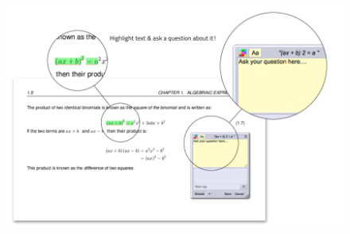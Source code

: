 {\begin{figure}[h]
\centering
\includegraphics[width=\textwidth]{title_images/questions.png}
\end{figure}


}


%
%
%





\normalfont
